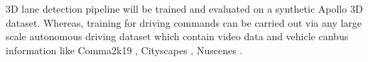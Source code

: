 3D lane detection pipeline will be trained and evaluated on a synthetic Apollo 3D \cite{guo2020gen} dataset. Whereas, training for driving commands can be carried out via any large scale autonomous driving dataset which contain video data and vehicle canbus information like Comma2k19 \cite{1812.05752},  Cityscapes \cite{DBLP:journals/corr/CordtsORREBFRS16}, Nuscenes \cite{DBLP:journals/corr/abs-1903-11027}.

